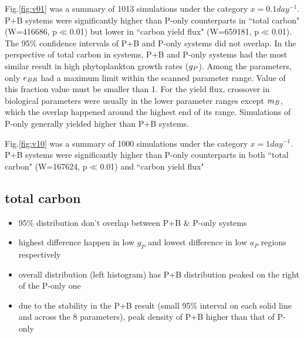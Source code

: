 \documentclass[../thesis.tex]{subfiles} %
\begin{document}
Fig.\ref{fig:v01} was a summary of 1013 simulations under the category $x=0.1day^{-1}$.  P+B systems were significantly higher than P-only counterparts in ``total carbon" (W=416686, p$\ll$0.01) but lower in ``carbon yield flux" (W=659181, p$\ll$0.01).  The 95\% confidence intervals of P+B and P-only systems did not overlap.  In the perspective of total carbon in systems, P+B and P-only systems had the most similar result in high phytoplankton growth rates ($g_P$).  Among the parameters, only $e_{BR}$ had a maximum limit within the scanned parameter range.  Value of this fraction value must be smaller than 1.  For the yield flux, crossover in biological parameters were usually in the lower parameter ranges except $m_B$, which the overlap happened around the highest end of its range.  Simulations of P-only generally yielded higher than P+B systems.

Fig.\ref{fig:v10} was a summary of 1000 simulations under the category $x=1day^{-1}$.  P+B systems were significantly higher than P-only counterparts in both ``total carbon" (W=167624, p$\ll$0.01) and ``carbon yield flux"

\subsection{total carbon}
\begin{itemize}
    \item 95\% distribution don't overlap between P+B \& P-only systems
    \item highest difference happen in low $g_P$ and lowest difference in low $a_P$ regions respectively
    \item overall distribution (left histogram) has P+B distribution peaked on the right of the P-only one
    \item due to the stability in the P+B result (small 95\% interval on each solid line and across the 8 parameters), peak density of P+B higher than that of P-only
\end{itemize}
\end{document}
